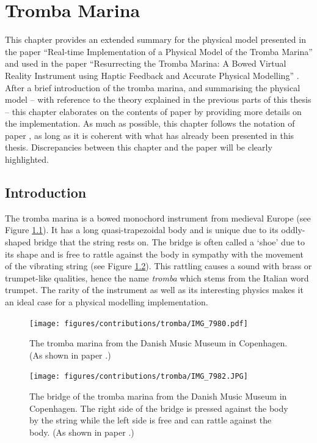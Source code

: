 \chapter{Tromba Marina}\label{ch:tromba}
This chapter provides an extended summary for the physical model presented in the paper ``Real-time Implementation of a Physical Model of the Tromba Marina'' \citeP[D] and used in the paper ``Resurrecting the Tromba Marina: A Bowed Virtual Reality Instrument using Haptic Feedback and Accurate Physical Modelling'' \citeP[E]. After a brief introduction of the tromba marina, and summarising the physical model -- with reference to the theory explained in the previous parts of this thesis -- this chapter elaborates on the contents of paper \citeP[D] by providing more details on the implementation. As much as possible, this chapter follows the notation of paper \citeP[D], as long as it is coherent with what has already been presented in this thesis. Discrepancies between this chapter and the paper will be clearly highlighted. 

\section{Introduction}
The tromba marina is a bowed monochord instrument from medieval Europe (see Figure \ref{fig:tromba}). It has a long quasi-trapezoidal body and is unique due to its oddly-shaped bridge that the string rests on. The bridge is often called a `shoe' due to its shape and is free to rattle against the body in sympathy with the movement of the vibrating string (see Figure \ref{fig:bridge}). This rattling causes a sound with brass or trumpet-like qualities, hence the name \textit{tromba} which stems from the Italian word trumpet. The rarity of the instrument as well as its interesting physics makes it an ideal case for a physical modelling implementation.

\begin{figure}
    \centering
    \texttt{[image: figures/contributions/tromba/IMG\_7980.pdf]}
    \caption{The tromba marina from the Danish Music Museum in Copenhagen. (As shown in paper \citeP[D].)}
\label{fig:tromba}
\end{figure}
  
\begin{figure}
    \centering
    \texttt{[image: figures/contributions/tromba/IMG\_7982.JPG]}
    \caption{The bridge of the tromba marina from the Danish Music Museum in Copenhagen. The right side of the bridge is pressed against the body by the string while the left side is free and can rattle against the body. (As shown in paper \citeP[D].)}
\label{fig:bridge}
\end{figure}


